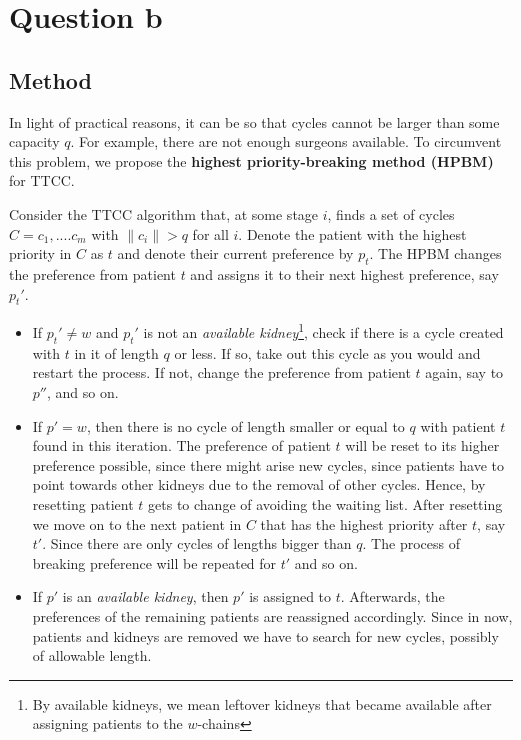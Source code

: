 \documentclass{article}
\newcommand{\norm}[1]{\lVert #1 \rVert}
\begin{document}
\section{Question b}
\subsection{Method}
In light of practical reasons, it can be so that cycles cannot be larger than some capacity $q$. For example, there are not enough surgeons available. To circumvent this problem, we propose the \textbf{highest priority-breaking method (HPBM)} for TTCC.

\noindent Consider the TTCC algorithm that, at some stage $i$, finds a set of cycles $C = {c_1, .... c_m}$ with $\norm{c_i} > q$ for all $i$. Denote the patient with the highest priority in $C$ as $t$ and denote their current preference by $p_t$. The HPBM changes the preference from patient $t$ and assigns it to their next highest preference, say $p_t'$.
\begin{itemize}
    \item If $p_t' \neq w$ and $p_t'$ is not an \textit{available kidney}\footnote{By available kidneys, we mean leftover kidneys that became available after assigning patients to the $w$-chains}, check if there is a cycle created with $t$ in it of length $q$ or less. If so, take out this cycle as you would and restart the process. If not, change the preference from patient $t$ again, say to $p''$, and so on.
    \item If $p' = w$, then there is no cycle of length smaller or equal to $q$ with patient $t$ found in this iteration. The preference of patient $t$ will be reset to its higher preference possible, since there might arise new cycles, since patients have to point towards other kidneys due to the removal of other cycles. Hence, by resetting patient $t$ gets to change of avoiding the waiting list. After resetting we move on to the next patient in $C$ that has the highest priority after $t$, say $t'$. Since there are only cycles of lengths bigger than $q$. The process of breaking preference will be repeated for $t'$ and so on.
    \item If $p'$ is an \textit{available kidney}, then $p'$ is assigned to $t$. Afterwards, the preferences of the remaining patients are reassigned accordingly. Since in now, patients and kidneys are removed we have to search for new cycles, possibly of allowable length.
\end{itemize}
\end{document}
